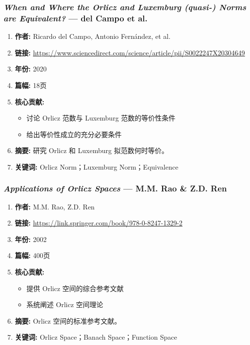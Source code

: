 \subsubsection{\textbf{\textit{When and Where the Orlicz and Luxemburg (quasi-) Norms are Equivalent?}} — del Campo et al.}
\begin{enumerate}
    \item \textbf{作者:} Ricardo del Campo, Antonio Fernández, et al.
    \item \textbf{链接:} \url{https://www.sciencedirect.com/science/article/pii/S0022247X20304649}
    \item \textbf{年份:} 2020
    \item \textbf{篇幅:} 18页
    \item \textbf{核心贡献:}
        \begin{itemize}
            \item 讨论 Orlicz 范数与 Luxemburg 范数的等价性条件
            \item 给出等价性成立的充分必要条件
        \end{itemize}
    \item \textbf{摘要:} 研究 Orlicz 和 Luxemburg 拟范数何时等价。
    \item \textbf{关键词:} Orlicz Norm；Luxemburg Norm；Equivalence
\end{enumerate}

\subsubsection{\textbf{\textit{Applications of Orlicz Spaces}} — M.M. Rao \& Z.D. Ren}
\begin{enumerate}
    \item \textbf{作者:} M.M. Rao, Z.D. Ren
    \item \textbf{链接:} \url{https://link.springer.com/book/978-0-8247-1329-2}
    \item \textbf{年份:} 2002
    \item \textbf{篇幅:} 400页
    \item \textbf{核心贡献:}
        \begin{itemize}
            \item 提供 Orlicz 空间的综合参考文献
            \item 系统阐述 Orlicz 空间理论
        \end{itemize}
    \item \textbf{摘要:} Orlicz 空间的标准参考文献。
    \item \textbf{关键词:} Orlicz Space；Banach Space；Function Space
\end{enumerate}

